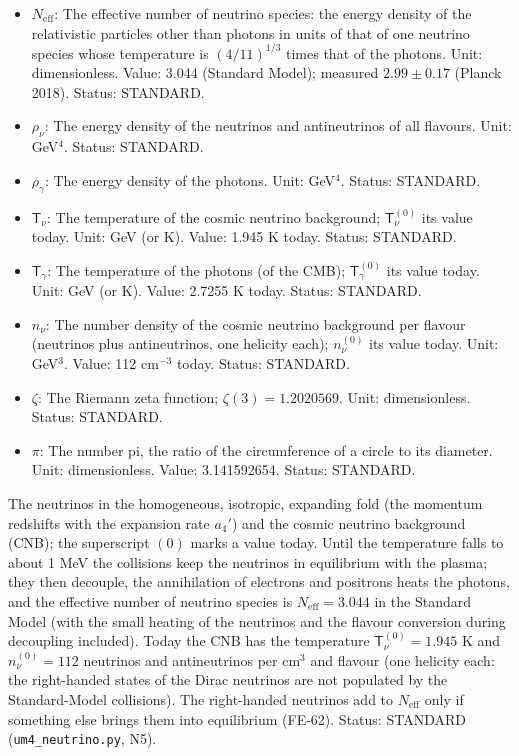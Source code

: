 \documentclass[
  10pt,
]{article}
\begin{document}
\begin{itemize}
  of momentum \(\vec p\): the rates of change of \(\varrho_{\vec p}\)
  and \(\bar\varrho_{\vec p}\) by emission, absorption, scattering and
  pair processes with the matter. Unit: GeV. Status: STANDARD.
\item
  \(N_{\mathrm{eff}}\): The effective number of neutrino species: the
  energy density of the relativistic particles other than photons in
  units of that of one neutrino species whose temperature is
  \((4/11)^{1/3}\) times that of the photons. Unit: dimensionless.
  Value: 3.044 (Standard Model); measured \(2.99 \pm 0.17\) (Planck
  2018). Status: STANDARD.
\item
  \(\rho_\nu\): The energy density of the neutrinos and antineutrinos of
  all flavours. Unit: GeV\(^4\). Status: STANDARD.
\item
  \(\rho_\gamma\): The energy density of the photons. Unit: GeV\(^4\).
  Status: STANDARD.
\item
  \(\mathsf{T}_\nu\): The temperature of the cosmic neutrino background;
  \(\mathsf{T}_\nu^{(0)}\) its value today. Unit: GeV (or K). Value:
  1.945 K today. Status: STANDARD.
\item
  \(\mathsf{T}_\gamma\): The temperature of the photons (of the CMB);
  \(\mathsf{T}_\gamma^{(0)}\) its value today. Unit: GeV (or K). Value:
  2.7255 K today. Status: STANDARD.
\item
  \(n_\nu\): The number density of the cosmic neutrino background per
  flavour (neutrinos plus antineutrinos, one helicity each);
  \(n_\nu^{(0)}\) its value today. Unit: GeV\(^3\). Value: 112
  cm\(^{-3}\) today. Status: STANDARD.
\item
  \(\zeta\): The Riemann zeta function; \(\zeta(3) = 1.2020569\). Unit:
  dimensionless. Status: STANDARD.
\item
  \(\pi\): The number pi, the ratio of the circumference of a circle to
  its diameter. Unit: dimensionless. Value: 3.141592654. Status:
  STANDARD.
\end{itemize}

The neutrinos in the homogeneous, isotropic, expanding fold (the
momentum redshifts with the expansion rate \(a_4'\)) and the cosmic
neutrino background (CNB); the superscript \((0)\) marks a value today.
Until the temperature falls to about 1 MeV the collisions keep the
neutrinos in equilibrium with the plasma; they then decouple, the
annihilation of electrons and positrons heats the photons, and the
effective number of neutrino species is \(N_{\mathrm{eff}} = 3.044\) in
the Standard Model (with the small heating of the neutrinos and the
flavour conversion during decoupling included). Today the CNB has the
temperature \(\mathsf{T}_\nu^{(0)} = 1.945\) K and \(n_\nu^{(0)} = 112\)
neutrinos and antineutrinos per cm\(^3\) and flavour (one helicity each:
the right-handed states of the Dirac neutrinos are not populated by the
Standard-Model collisions). The right-handed neutrinos add to
\(N_{\mathrm{eff}}\) only if something else brings them into equilibrium
(FE-62). Status: STANDARD (\texttt{um4\_neutrino.py}, N5).
\end{document}
